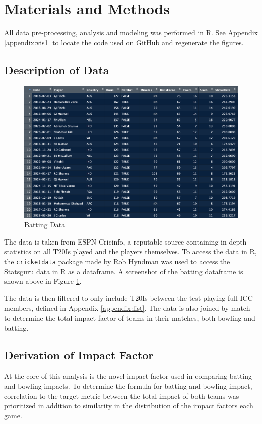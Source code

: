 \documentclass{article}[12pt]
\begin{document}
\section{Materials and Methods}

All data pre-processing, analysis and modeling was performed in R. \parencite{r_software} See Appendix \ref{appendix:vis1} to locate the code used on GitHub and regenerate the figures.

\subsection{Description of Data}
\begin{figure}[!h]
    \centering
    \includegraphics[width=0.5\linewidth]{batting_data.png}
    \caption{Batting Data}
    \label{fig:batting_data}
\end{figure}

 The data is taken from ESPN Cricinfo, a reputable source containing in-depth statistics on all T20Is played and the players themselves. \parencite{espn_2025_espncricinfo} To access the data in R, the \texttt{cricketdata} package made by Rob Hyndman \parencite{cricketdata} was used to access the Statsguru data in R as a dataframe. A screenshot of the batting dataframe is shown above in Figure \ref{fig:batting_data}.

The data is then filtered to only include T20Is between the test-playing full ICC members, defined in Appendix \ref{appendix:list}. The data is also joined by match to determine the total impact factor of teams in their matches, both bowling and batting.

\subsection{Derivation of Impact Factor}

At the core of this analysis is the novel impact factor used in comparing batting and bowling impacts. To determine the formula for batting and bowling impact, correlation to the target metric between the total impact of both teams was prioritized in addition to similarity in the distribution of the impact factors each game.
\end{document}
